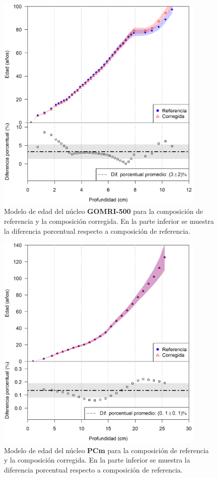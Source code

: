 \begin{figure}[h]
\centering
\includegraphics[width=0.9\textwidth]{Imagenes/GOMRI500_1.png}
\caption{Modelo de edad del núcleo \textbf{GOMRI-500} para la composición de referencia y la composición corregida. En la parte inferior se muestra la diferencia porcentual respecto a composición de referencia.}\label{ModeloEdad-GOMRI500}
\end{figure}

\begin{figure}[h]
\centering
\includegraphics[width=0.9\textwidth]{Imagenes/PCm_1.png}
\caption{Modelo de edad del núcleo \textbf{PCm} para la composición de referencia y la composición corregida. En la parte inferior se muestra la diferencia porcentual respecto a composición de referencia.}\label{ModeloEdad-PCm}
\end{figure}

